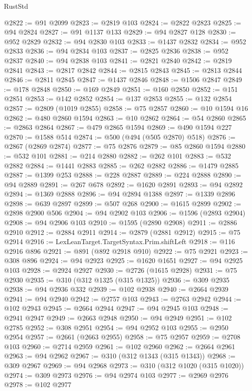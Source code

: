 \begin{lexlean}{RustStd}
\begin{coremodule}
{\begin{coremodule}
{{{{{{{{{{{{{{{{{{{{{{{{{{{{{{{{{{{{{@2822 := @91 @2099
@2823 := @2819 @103
@2824 := @2822 @2823
@2825 := @94 @2824
@2827 := @91 @1137 @133
@2829 := @94 @2827 @128
@2830 := @952 @2829
@2832 := @94 @2830 @103
@2833 := @1437 @2832
@2834 := @952 @2833
@2836 := @94 @2834 @103
@2837 := @2825 @2836
@2838 := @952 @2837
@2840 := @94 @2838 @103
@2841 := @2821 @2840
@2842 := @2819 @2841
@2843 := @2817 @2842
@2844 := @2815 @2843
@2845 := @2813 @2844
@2846 := @2811 @2845
@2847 := @1437 @2846
@2848 := @1506 @2847
@2849 := @178 @2848
@2850 := @169 @2849
@2851 := @160 @2850
@2852 := @151 @2851
@2853 := @142 @2852
@2854 := @137 @2853
@2855 := @132 @2854
@2857 := @2809 (@1019 @2855)
@2858 := @75 @2857
@2860 := @10 @1594 @16
@2862 := @480 @2860 @1594
@2863 := @10 @2862
@2864 := @54 @2860
@2865 := @2863 @2864
@2867 := @479 @2865 @1594
@2869 := @490 @1594 @227
@2870 := @1588 @514
@2874 := @500 (@494 (@505 @2870) @518)
@2876 := @2867 (@2869 @2874)
@2877 := @75 @2876
@2879 := @85 @2860 @1594
@2880 := @532 @101
@2881 := @214 @2880
@2882 := @262 @101
@2883 := @532 @2882
@2884 := @1441 @2883
@2885 := @262 @2882
@2886 := @1479 @2885
@2887 := @1399 @253
@2888 := @228 @2887
@2889 := @224 @2888
@2890 := @94 @2889
@2891 := @267 @678
@2892 := @1620 @2891
@2893 := @94 @2892
@2894 := @1369 @2888
@2896 := @94 @2894 @1388
@2897 := @1339 @2896
@2898 := @639 @2897
@2899 := @507 @268
@2900 := @1615 @2899
@2902 := @2898 @2900 @506
@2904 := @94 @2902 @103
@2906 := @1596 (@2893 @2904)
@2908 := @94 @2906 @103
@2910 := @1595 (@2890 @2908)
@2911 := @2886 @2910
@2912 := @2884 @2911
@2914 := @2879 (@2881 @2912)
@2915 := @75 @2914
@2916 := LexLeanTarget.TargetSyntax.Prim.shiftLeft
@2918 := @116 @2916 @896
@2921 := @891 (@892 @2918 @910)
@2922 := @75 @2921
@2923 := @308 @896
@2924 := @94 @2923
@2925 := @1620 @1651
@2927 := @94 @2925 @103
@2928 := @2924 @2927
@2930 := @2726 (@1615 @2928)
@2931 := @75 @2930
@2935 := @310 (@312 @1325 (@315 @1325))
@2936 := @309 @2935
@2938 := @94 @2936 @332
@2939 := @102 @2938
@2940 := @2664 @2939
@2941 := @94 @2940
@2942 := @2757 @103
@2943 := @2763 @2942
@2944 := @102 @2943
@2945 := @2664 @2944
@2947 := @94 @2945 @103
@2948 := @2941 @2947
@2949 := @2663 @2948
@2950 := @94 @2949
@2951 := @102 @2785
@2952 := @308 @2951
@2954 := @94 @2952 @103
@2955 := @2950 @2954
@2957 := @2661 (@2663 @2955)
@2958 := @75 @2957
@2959 := @2708 @103
@2960 := @2714 @2959
@2961 := @102 @2960
@2962 := @2664 @2961
@2963 := @94 @2962
@2967 := @310 (@312 @1343 (@315 @1343))
@2968 := @309 @2967
@2969 := @94 @2968
@2973 := @310 (@312 @1020 (@315 @1020))
@2974 := @309 @2973
@2976 := @94 @2974 @103
@2977 := @2969 @2976
@2978 := @102 @2977
}}}}}}}}}}}}}}}}}}}}}}}}}}}}}}}}}}}}}
\end{coremodule}}
\end{coremodule}
\end{lexlean}
